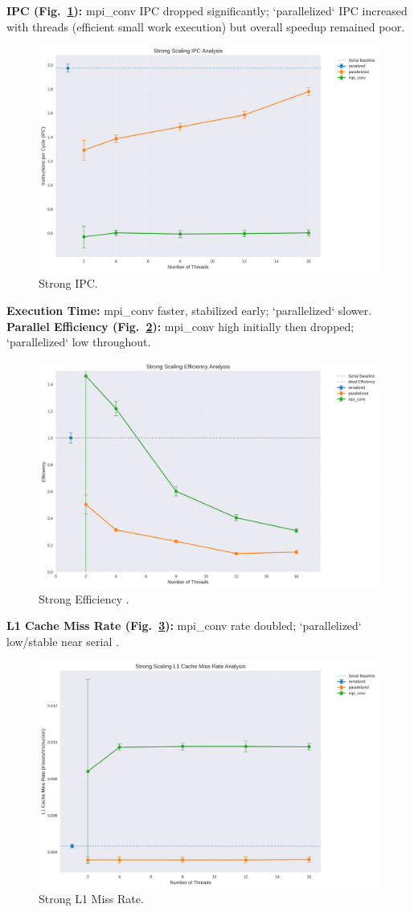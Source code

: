 \documentclass[conference, 10pt]{IEEEtran}
\begin{document}
    \textbf{IPC (Fig.~\ref{fig:strong-scaling-ipc}):} mpi\_conv IPC dropped significantly; `parallelized` IPC increased with threads (efficient small work execution) but overall speedup remained poor.
\begin{figure}[H] \centering \includegraphics[width=0.7\linewidth]{figures/ipc_vs_threads.png} \caption{Strong IPC.}\label{fig:strong-scaling-ipc}\end{figure}
    \textbf{Execution Time:} mpi\_conv faster, stabilized early; `parallelized` slower.
    \textbf{Parallel Efficiency (Fig.~\ref{fig:strong-scaling-efficiency}):} mpi\_conv high initially then dropped; `parallelized` low throughout.
\begin{figure}[H] \centering \includegraphics[width=0.7\linewidth]{figures/efficiency_vs_threads.png} \caption{Strong Efficiency \cite{Rajput2013}.}\label{fig:strong-scaling-efficiency}\end{figure}
    \textbf{L1 Cache Miss Rate (Fig.~\ref{fig:strong-scaling-l1-miss}):} mpi\_conv rate doubled; `parallelized` low/stable near serial \cite{Yoon2012}.
\begin{figure}[H] \centering \includegraphics[width=0.7\linewidth]{figures/l1_miss_rate_vs_threads.png} \caption{Strong L1 Miss Rate.}\label{fig:strong-scaling-l1-miss}\end{figure}
\end{document}
